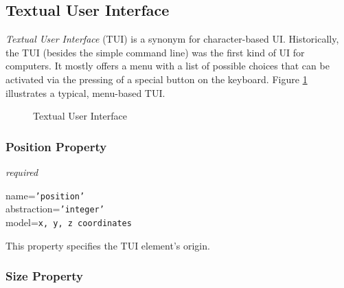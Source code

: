 %
%
%
%
%
%

\subsection{Textual User Interface}
\label{textual_user_interface_heading}

\emph{Textual User Interface} (TUI) is a synonym for character-based UI.
Historically, the TUI (besides the simple command line) was the first kind of
UI for computers. It mostly offers a menu with a list of possible choices that
can be activated via the pressing of a special button on the keyboard. Figure
\ref{textual_user_interface_figure} illustrates a typical, menu-based TUI.

\begin{figure}[ht]
    \begin{center}
        \caption{Textual User Interface}
        \label{textual_user_interface_figure}
    \end{center}
\end{figure}

\subsubsection{Position Property}

\emph{required}

name=\texttt{'position'}\\
abstraction=\texttt{'integer'}\\
model=\texttt{x, y, z coordinates}

This property specifies the TUI element's origin.

\subsubsection{Size Property}

